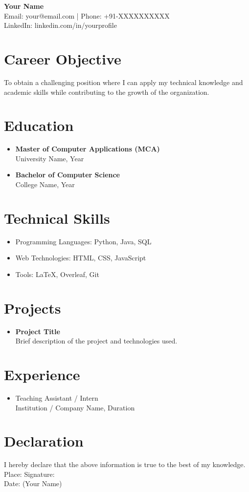 \documentclass[11pt,a4paper]{article}
\begin{document}
\begin{center}
{\Huge \textbf{Your Name}}\\[0.2cm]
Email: your@email.com \;|\; Phone: +91-XXXXXXXXXX\\
LinkedIn: linkedin.com/in/yourprofile
\end{center}
\section*{Career Objective}
To obtain a challenging position where I can apply my technical knowledge and academic skills while contributing to the growth of the organization.
\section*{Education}
\begin{itemize}[leftmargin=*]
\item \textbf{Master of Computer Applications (MCA)}\\ University Name, Year
\item \textbf{Bachelor of Computer Science}\\ College Name, Year
\end{itemize}
\section*{Technical Skills}
\begin{itemize}[leftmargin=*]
\item Programming Languages: Python, Java, SQL
\item Web Technologies: HTML, CSS, JavaScript
\item Tools: LaTeX, Overleaf, Git
\end{itemize}
\section*{Projects}
\begin{itemize}[leftmargin=*]
\item \textbf{Project Title}\\ Brief description of the project and technologies used.
\end{itemize}
\section*{Experience}
\begin{itemize}[leftmargin=*]
\item Teaching Assistant / Intern\\ Institution / Company Name, Duration
\end{itemize}
\section*{Declaration}
I hereby declare that the above information is true to the best of my knowledge.
\vspace{0.5cm}
\noindent Place: \hspace{4cm} Signature:\\
Date: \hspace{4.3cm} (Your Name)
\end{document}
